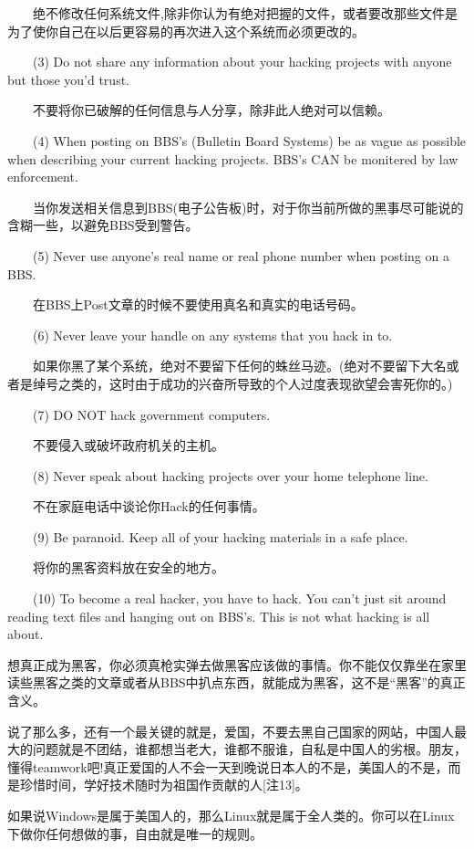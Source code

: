 \documentclass[12pt,a4paper]{article}
\begin{document}
\begin{CJK}{UTF8}{gbsn}
　　绝不修改任何系统文件,除非你认为有绝对把握的文件，或者要改那些文件是为了使你自己在以后更容易的再次进入这个系统而必须更改的。

　　(3) Do not share any information about your hacking projects with anyone but those you'd trust.

　　不要将你已破解的任何信息与人分享，除非此人绝对可以信赖。

　　(4) When posting on BBS's (Bulletin Board Systems) be as vague as possible when describing your current hacking projects. BBS's CAN be monitered by law enforcement.

　　当你发送相关信息到BBS(电子公告板)时，对于你当前所做的黑事尽可能说的含糊一些，以避免BBS受到警告。

　　(5) Never use anyone's real name or real phone number when posting on a BBS.

　　在BBS上Post文章的时候不要使用真名和真实的电话号码。

　　(6) Never leave your handle on any systems that you hack in to.

　　如果你黑了某个系统，绝对不要留下任何的蛛丝马迹。(绝对不要留下大名或者是绰号之类的，这时由于成功的兴奋所导致的个人过度表现欲望会害死你的。)

　　(7) DO NOT hack government computers.

　　不要侵入或破坏政府机关的主机。

　　(8) Never speak about hacking projects over your home telephone line.

　　不在家庭电话中谈论你Hack的任何事情。

　　(9) Be paranoid. Keep all of your hacking materials in a safe place.

　　将你的黑客资料放在安全的地方。

　　(10) To become a real hacker, you have to hack. You can't just sit around reading text files and hanging out on BBS's. This is not what hacking is all about.

想真正成为黑客，你必须真枪实弹去做黑客应该做的事情。你不能仅仅靠坐在家里读些黑客之类的文章或者从BBS中扒点东西，就能成为黑客，这不是“黑客”的真正含义。

说了那么多，还有一个最关键的就是，爱国，不要去黑自己国家的网站，中国人最大的问题就是不团结，谁都想当老大，谁都不服谁，自私是中国人的劣根。朋友，懂得teamwork吧!真正爱国的人不会一天到晚说日本人的不是，美国人的不是，而是珍惜时间，学好技术随时为祖国作贡献的人[注13]。

如果说Windows是属于美国人的，那么Linux就是属于全人类的。你可以在Linux下做你任何想做的事，自由就是唯一的规则。


\end{CJK}
\end{document}
